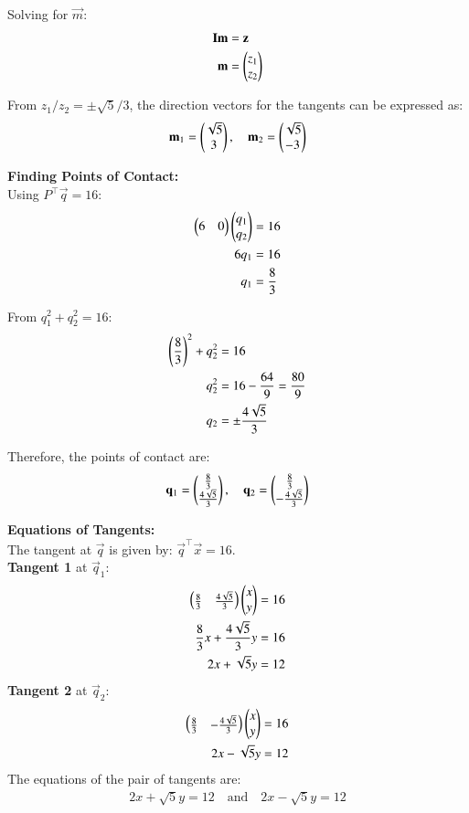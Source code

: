 \documentclass[article]{IEEEtran}
\begin{document}
	Solving for $\vec{m}$:
	\begin{align}
		\mathbf{I}\mathbf{m} &= \mathbf{z}\\
		\mathbf{m} &= \begin{pmatrix}z_1\\z_2\end{pmatrix}
	\end{align}
	
	From $z_1/z_2 = \pm\sqrt{5}/3$, the direction vectors for the tangents can be expressed as:
	\begin{align}
		\mathbf{m}_1 = \begin{pmatrix}\sqrt{5}\\3\end{pmatrix}, \quad \mathbf{m}_2 = \begin{pmatrix}\sqrt{5}\\-3\end{pmatrix}
	\end{align}
	
	\textbf{Finding Points of Contact:}\\
	Using $P^\top\vec{q} = 16$:
	\begin{align}
		\begin{pmatrix}6 & 0\end{pmatrix}\begin{pmatrix}q_1\\q_2\end{pmatrix} &= 16\\
		6q_1 &= 16\\
		q_1 &= \frac{8}{3}
	\end{align}
	
	From $q_1^2 + q_2^2 = 16$:
	\begin{align}
		\left(\frac{8}{3}\right)^2 + q_2^2 &= 16\\
		q_2^2 &= 16 - \frac{64}{9} = \frac{80}{9}\\
		q_2 &= \pm\frac{4\sqrt{5}}{3}
	\end{align}
	
	Therefore, the points of contact are:
	\begin{align}
		\mathbf{q}_1 = \begin{pmatrix}\frac{8}{3}\\\frac{4\sqrt{5}}{3}\end{pmatrix}, \quad \mathbf{q}_2 = \begin{pmatrix}\frac{8}{3}\\-\frac{4\sqrt{5}}{3}\end{pmatrix}
	\end{align}
	
	\textbf{Equations of Tangents:}\\
	The tangent at $\vec{q}$ is given by: $\vec{q}^\top\vec{x} = 16$.\\
	\textbf{Tangent 1} at $\vec{q}_1$:
	\begin{align}
		\begin{pmatrix}\frac{8}{3} & \frac{4\sqrt{5}}{3}\end{pmatrix}\begin{pmatrix}x\\y\end{pmatrix} &= 16\\
		\frac{8}{3}x + \frac{4\sqrt{5}}{3}y &= 16\\
		2x + \sqrt{5}y &= 12
	\end{align}	
	\textbf{Tangent 2} at $\vec{q}_2$:
	\begin{align}
		\begin{pmatrix}\frac{8}{3} & -\frac{4\sqrt{5}}{3}\end{pmatrix}\begin{pmatrix}x\\y\end{pmatrix} &= 16\\
		2x - \sqrt{5}y &= 12
	\end{align}
	The equations of the pair of tangents are:
	\begin{align}
		\boxed{2x + \sqrt{5}y = 12 \quad \text{and} \quad 2x - \sqrt{5}y = 12}
	\end{align}
	
\end{document}

